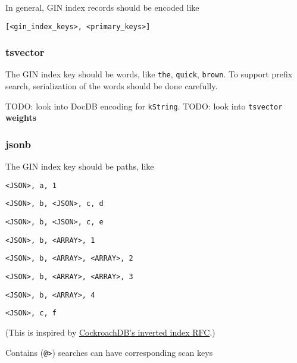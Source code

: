 \documentclass[11pt]{article}
\begin{document}
In general, GIN index records should be encoded like

\texttt{{[}\textless{}gin\_index\_keys\textgreater{},\ \textless{}primary\_keys\textgreater{}{]}}

\hypertarget{tsvector}{%
\subsubsection{tsvector}\label{tsvector}}

The GIN index key should be words, like \texttt{the}, \texttt{quick},
\texttt{brown}. To support prefix search, serialization of the words
should be done carefully.

TODO: look into DocDB encoding for \texttt{kString}. TODO: look into
\texttt{tsvector} \textbf{weights}

\hypertarget{jsonb}{%
\subsubsection{jsonb}\label{jsonb}}

The GIN index key should be paths, like

\begin{oparts}
\item
  \texttt{\textless{}JSON\textgreater{},\ a,\ 1}
\item
  \texttt{\textless{}JSON\textgreater{},\ b,\ \textless{}JSON\textgreater{},\ c,\ d}
\item
  \texttt{\textless{}JSON\textgreater{},\ b,\ \textless{}JSON\textgreater{},\ c,\ e}
\item
  \texttt{\textless{}JSON\textgreater{},\ b,\ \textless{}ARRAY\textgreater{},\ 1}
\item
  \texttt{\textless{}JSON\textgreater{},\ b,\ \textless{}ARRAY\textgreater{},\ \textless{}ARRAY\textgreater{},\ 2}
\item
  \texttt{\textless{}JSON\textgreater{},\ b,\ \textless{}ARRAY\textgreater{},\ \textless{}ARRAY\textgreater{},\ 3}
\item
  \texttt{\textless{}JSON\textgreater{},\ b,\ \textless{}ARRAY\textgreater{},\ 4}
\item
  \texttt{\textless{}JSON\textgreater{},\ c,\ f}
\end{oparts}

(This is inspired by
\href{https://github.com/cockroachdb/cockroach/blob/master/docs/RFCS/20171020_inverted_indexes.md}{CockroachDB's
inverted index RFC}.)

Contains (\texttt{@\textgreater{}}) searches can have corresponding scan
keys
\end{document}
